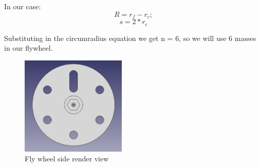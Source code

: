 In our case:
\[ R = r_f - r_c; \]
\[ s = 2 * r_c\]

Substituting in the circumradius equation we get n = 6, so we will use 6 masses in our flywheel.
  
\begin{figure}
	\centering
	\includegraphics[width=5cm]{img/fly_wheel_side.png}
	\caption{Fly wheel side render view}
	\label{fig:Fly wheel side render view}
\end{figure}


